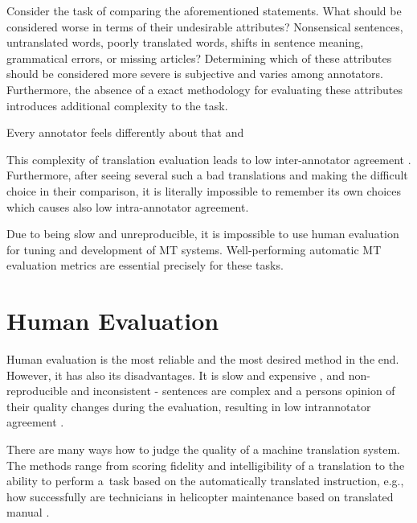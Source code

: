 Consider the task of comparing the aforementioned statements. What should be considered worse in terms of their undesirable attributes? Nonsensical sentences, untranslated words, poorly translated words, shifts in sentence meaning, grammatical errors, or missing articles? Determining which of these attributes should be considered more severe is subjective and varies among annotators. Furthermore, the absence of a exact methodology for evaluating these attributes introduces additional complexity to the task.


Every annotator feels differently about that and

This complexity of translation evaluation leads to low inter-annotator agreement \cite{wmt13}. 
Furthermore, after seeing several such a bad translations and making the difficult choice in their comparison, it is literally impossible to remember its own choices which causes also low intra-annotator agreement.

Due to being slow and unreproducible, it is impossible to use human evaluation for tuning and development of MT systems. 
Well-performing automatic MT evaluation metrics are essential precisely for these tasks. 









\section{Human Evaluation}
Human evaluation is the most reliable and the most desired method in the end.
However, it has also its disadvantages. 
It is slow and expensive , and non-reproducible and inconsistent - sentences are complex and a persons opinion of their quality changes during the evaluation, resulting in low intrannotator agreement .

There are many ways how to judge the quality of a machine translation system. 
The methods range from scoring fidelity and intelligibility of a translation to the ability to perform a~task based on the automatically translated instruction, e.g., how successfully are technicians in  helicopter maintenance based on translated manual \cite{Sinaiko}.

